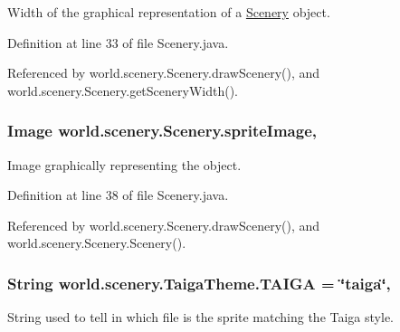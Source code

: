 Width of the graphical representation of a \hyperlink{classworld_1_1scenery_1_1_scenery}{Scenery} object. 



Definition at line 33 of file Scenery.\-java.



Referenced by world.\-scenery.\-Scenery.\-draw\-Scenery(), and world.\-scenery.\-Scenery.\-get\-Scenery\-Width().

\hypertarget{classworld_1_1scenery_1_1_scenery_a512d9c0a154e6843389e343d80843326}{
\subsubsection[{sprite\-Image}]{\setlength{\rightskip}{0pt plus 5cm}Image world.\-scenery.\-Scenery.\-sprite\-Image\hspace{0.3cm}{\ttfamily [protected]}, {\ttfamily [inherited]}}}\label{classworld_1_1scenery_1_1_scenery_a512d9c0a154e6843389e343d80843326}


Image graphically representing the object. 



Definition at line 38 of file Scenery.\-java.



Referenced by world.\-scenery.\-Scenery.\-draw\-Scenery(), and world.\-scenery.\-Scenery.\-Scenery().

\hypertarget{interfaceworld_1_1scenery_1_1_taiga_theme_ad3418d8f4936efb0ef1e3eb2009a34f0}{
\subsubsection[{T\-A\-I\-G\-A}]{\setlength{\rightskip}{0pt plus 5cm}String world.\-scenery.\-Taiga\-Theme.\-T\-A\-I\-G\-A = \char`\"{}taiga\char`\"{}\hspace{0.3cm}{\ttfamily [static]}, {\ttfamily [inherited]}}}\label{interfaceworld_1_1scenery_1_1_taiga_theme_ad3418d8f4936efb0ef1e3eb2009a34f0}


String used to tell in which file is the sprite matching the Taiga style. 



